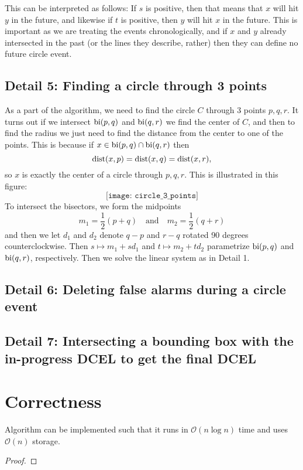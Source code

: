 This can be interpreted as follows: If $s$ is positive, then that means that $x$ will hit $y$ in the future, and likewise if $t$ is positive, then $y$ will hit $x$ in the future. This is important as we are treating the events chronologically, and if $x$ and $y$ already intersected in the past (or the lines they describe, rather) then they can define no future circle event.

\subsection*{Detail 5: Finding a circle through 3 points}
As a part of the algorithm, we need to find the circle $C$ through 3 points $p, q, r$. It turns out if we intersect $\operatorname{bi}(p, q)$ and $\operatorname{bi}(q, r)$ we find the center of $C$, and then to find the radius we just need to find the distance from the center to one of the points. This is because if $x \in \operatorname{bi}(p, q) \cap \operatorname{bi}(q, r)$ then
\[
    \operatorname{dist}(x, p) = \operatorname{dist}(x, q) = \operatorname{dist}(x, r),
\]
so $x$ is exactly the center of a circle through $p, q, r$. This is illustrated in this figure:
\[
    \texttt{[image: circle\_3\_points]}
\]
To intersect the bisectors, we form the midpoints
\[
    m_1 = \frac{1}{2}(p + q) \quad \text{and} \quad m_2 = \frac{1}{2}(q + r)
\]
and then we let $d_1$ and $d_2$ denote $q - p$ and $r - q$ rotated 90 degrees counterclockwise. Then $s \mapsto m_1 + s d_1$ and $t \mapsto m_2 + t d_2$ parametrize $\operatorname{bi}(p, q)$ and $\operatorname{bi}(q, r)$, respectively. Then we solve the linear system as in Detail 1.

\subsection*{Detail 6: Deleting false alarms during a circle event}
\subsection*{Detail 7: Intersecting a bounding box with the in-progress DCEL to get the final DCEL}

\section{Correctness}
\begin{lem}
Algorithm \label{alg:fortune} can be implemented such that it runs in $\mathcal{O}(n \log n)$ time and uses $\mathcal{O}(n)$ storage.
\end{lem}
\begin{proof}
\end{proof}